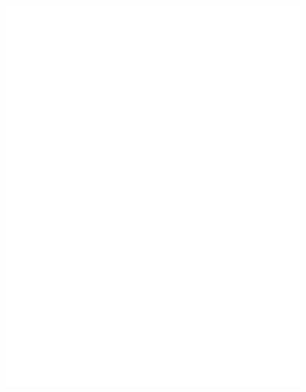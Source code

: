 \begin{figure}
\includegraphics[height=8.5in]{Figures/eukarya-0p1-ins}
\label{fig:eukinfo}
\end{figure}

\newpage

